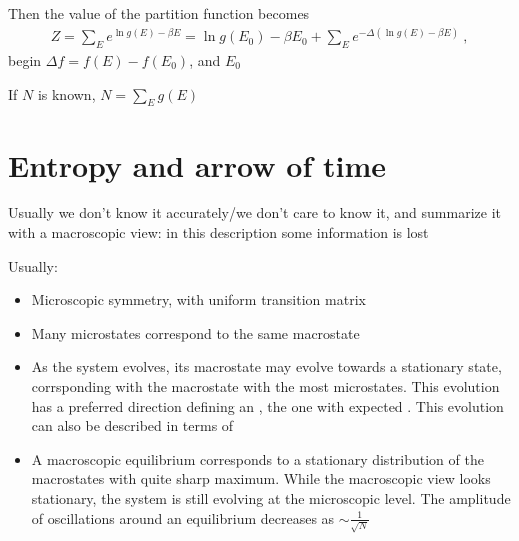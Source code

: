 \documentclass[letterpaper,10pt,english]{jupyterBook}
\begin{document}
\sphinxAtStartPar
Then the value of the partition function becomes
\begin{equation*}
\begin{split}Z = \sum_E e^{\ln g(E) - \beta E} = \ln g(E_0) - \beta E_0 + \sum_E e^{- \Delta \left( \ln g(E) - \beta E \right)} \ ,\end{split}
\end{equation*}
\sphinxAtStartPar
begin \(\Delta f = f(E) - f(E_0)\), and \(E_0\)

\sphinxAtStartPar
If \(N\) is known, \(N = \sum_E g(E)\)

\sphinxstepscope


\chapter{Entropy and arrow of time}
\label{\detokenize{ch/statistical-mechanics/entropy:entropy-and-arrow-of-time}}\label{\detokenize{ch/statistical-mechanics/entropy:statistical-mechanics-entropy}}\label{\detokenize{ch/statistical-mechanics/entropy::doc}}
\sphinxAtStartPar
{} Usually we don’t know it accurately/we don’t care to know it, and summarize it with a macroscopic view: in this description some information is lost

\sphinxAtStartPar
Usually:
\begin{itemize}
\item {} 
\sphinxAtStartPar
Microscopic symmetry, with uniform transition matrix

\item {} 
\sphinxAtStartPar
Many microstates correspond to the same macrostate

\item {} 
\sphinxAtStartPar
As the system evolves, its macrostate may evolve towards a stationary state, corrsponding with the macrostate with the most microstates. This evolution has a preferred direction \sphinxhyphen{} defining an  \sphinxhyphen{}, the one with  expected . This evolution can also be described in terms of 

\item {} 
\sphinxAtStartPar
A macroscopic equilibrium corresponds to a stationary distribution of the macrostates with quite sharp maximum. While the macroscopic view looks stationary, the system is still evolving at the microscopic level. The amplitude of oscillations around an equilibrium decreases as \(\sim \frac{1}{\sqrt{N}}\)

\end{itemize}
\end{document}
